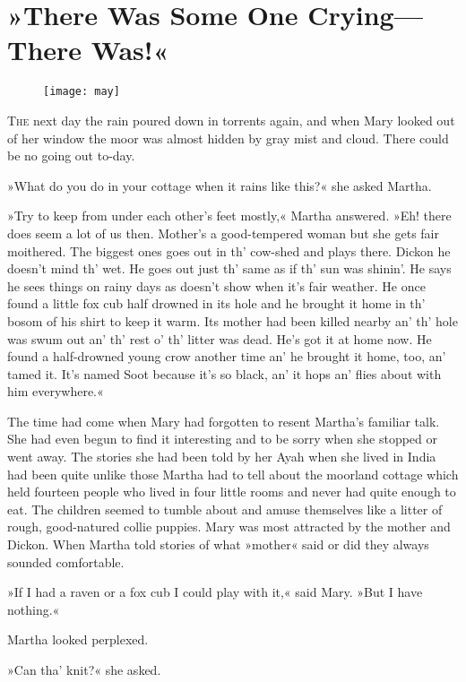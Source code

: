 \chapter{»There Was Some One Crying—There Was!«}
\begin{figure}[t!]
\centering
\texttt{[image: may]}
\end{figure}

	\lettrine[lines=6]{T}{he} next day the rain poured down in torrents again, and when Mary looked out of her window the moor was almost hidden by gray mist and cloud. There could be no going out to-day.

\zz
»What do you do in your cottage when it rains like this?« she asked Martha.

»Try to keep from under each other's feet mostly,« Martha answered. »Eh! there does seem a lot of us then. Mother's a good-tempered woman but she gets fair moithered. The biggest ones goes out in th' cow-shed and plays there. Dickon he doesn't mind th' wet. He goes out just th' same as if th' sun was shinin'. He says he sees things on rainy days as doesn't show when it's fair weather. He once found a little fox cub half drowned in its hole and he brought it home in th' bosom of his shirt to keep it warm. Its mother had been killed nearby an' th' hole was swum out an' th' rest o' th' litter was dead. He's got it at home now. He found a half-drowned young crow another time an' he brought it home, too, an' tamed it. It's named Soot because it's so black, an' it hops an' flies about with him everywhere.«

The time had come when Mary had forgotten to resent Martha's familiar talk. She had even begun to find it interesting and to be sorry when she stopped or went away. The stories she had been told by her Ayah when she lived in India had been quite unlike those Martha had to tell about the moorland cottage which held fourteen people who lived in four little rooms and never had quite enough to eat. The children seemed to tumble about and amuse themselves like a litter of rough, good-natured collie puppies. Mary was most attracted by the mother and Dickon. When Martha told stories of what »mother« said or did they always sounded comfortable.

»If I had a raven or a fox cub I could play with it,« said Mary. »But I have nothing.«

Martha looked perplexed.

»Can tha' knit?« she asked.

